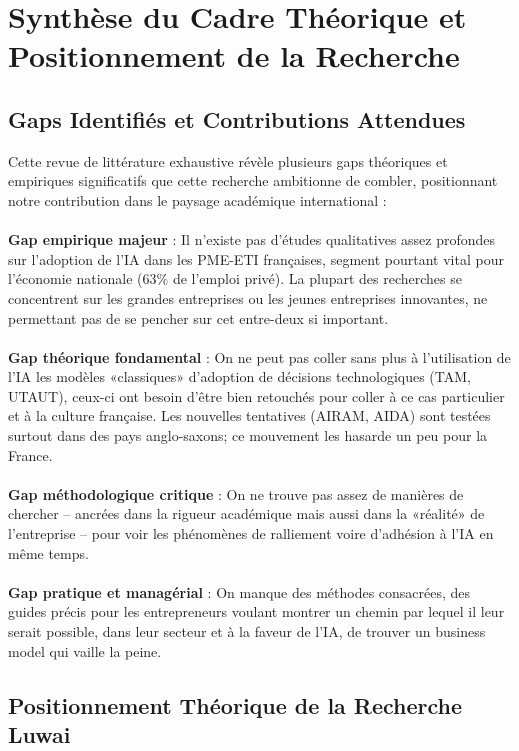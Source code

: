 \section{Synthèse du Cadre Théorique et Positionnement de la Recherche}

\subsection{Gaps Identifiés et Contributions Attendues}

Cette revue de littérature exhaustive révèle plusieurs gaps théoriques et empiriques significatifs que cette recherche ambitionne de combler, positionnant notre contribution dans le paysage académique international :
\\\\
\textbf{Gap empirique majeur} : Il n’existe pas d’études qualitatives assez profondes sur l’adoption de l’IA dans les PME-ETI françaises, segment pourtant vital pour l’économie nationale (63\% de l’emploi privé). La plupart des recherches se concentrent sur les grandes entreprises ou les jeunes entreprises innovantes, ne permettant pas de se pencher sur cet entre-deux si important.
\\\\
\textbf{Gap théorique fondamental} : On ne peut pas coller sans plus à l’utilisation de l’IA les modèles «classiques» d’adoption de décisions technologiques (TAM, UTAUT), ceux-ci ont besoin d’être bien retouchés pour coller à ce cas particulier et à la culture française. Les nouvelles tentatives (AIRAM, AIDA) sont testées surtout dans des pays anglo-saxons; ce mouvement les hasarde un peu pour la France.
\\\\
\textbf{Gap méthodologique critique} : On ne trouve pas assez de manières de chercher – ancrées dans la rigueur académique mais aussi dans la «réalité» de l’entreprise – pour voir les phénomènes de ralliement voire d’adhésion à l’IA en même temps.
\\\\
\textbf{Gap pratique et managérial} : On manque des méthodes consacrées, des guides précis pour les entrepreneurs voulant montrer un chemin par lequel il leur serait possible, dans leur secteur et à la faveur de l’IA, de trouver un business model qui vaille la peine.

\subsection{Positionnement Théorique de la Recherche Luwai}

